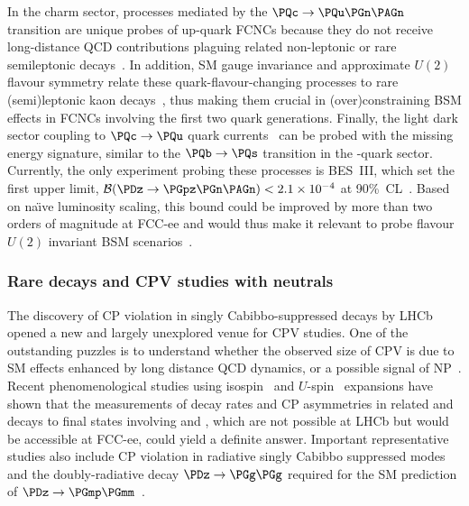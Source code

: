 In the charm sector, processes mediated by the $\PQc \to \PQu \PGn\PAGn$ transition are unique probes of up-quark FCNCs 
because they do not receive long-distance QCD contributions plaguing related non-leptonic or rare semileptonic decays~\cite{Artuso:2008vf}. 
In addition, SM gauge invariance and approximate $U(2)$ flavour symmetry 
relate these quark-flavour-changing processes to rare (semi)leptonic kaon decays~\cite{Bause:2020auq, Bause:2020xzj, Fajfer:2023nmz}, 
thus making them crucial in (over)constraining BSM effects in FCNCs involving the first two quark generations.  
Finally, the light dark sector coupling to $\PQc \to \PQu$ quark currents~\cite{Kamenik:2011vy, Li:2023sjf} 
can be probed with the missing energy signature, 
similar to the $\PQb \to \PQs$ transition in the \PQb-quark sector. 
Currently, the only experiment probing these processes is BES~III, which set the first upper limit, 
$\mathcal B(\PDz \to \PGpz \PGn \PAGn) < 2.1 \times 10^{-4}$ at 90\%~CL~\cite{BESIII:2021slf}. 
Based on na{\"\i}ve luminosity scaling, 
this bound could be improved by more than two orders of magnitude at FCC-ee 
and would thus make it relevant to probe flavour $U(2)$ invariant BSM scenarios~\cite{Fajfer:2023nmz}.  

\subsubsection{Rare decays and CPV studies with neutrals}

The discovery of CP violation in singly Cabibbo-suppressed \PD decays by LHCb~\cite{LHCb:2019hro} 
opened a new and largely unexplored venue for CPV studies. 
One of the outstanding puzzles is to understand whether the observed size of CPV 
is due to SM effects enhanced by long distance QCD dynamics, 
or a possible signal of NP~\cite{Chala:2019fdb, Dery:2019ysp}. 
Recent phenomenological studies using isospin~\cite{Grossman:2012eb, Gavrilova:2023fzy} 
and $U$-spin~\cite{Grossman:2019xcj, Bause:2022jes} expansions 
have shown that the measurements of decay rates and CP asymmetries in related \PD and \PDs decays 
to final states involving \PGpz and \PKzS, 
which are not possible at LHCb but would be accessible at FCC-ee, could yield a definite answer.
Important representative studies also include CP violation in 
radiative singly Cabibbo suppressed modes~\cite{Isidori:2012yx, Gisbert:2020vjx, Adolph:2022ujd}
and the doubly-radiative decay $\PDz \to \PGg \PGg$ 
required for the SM prediction of $\PDz \to \PGmp \PGmm$~\cite{Burdman:2001tf}.  
    
